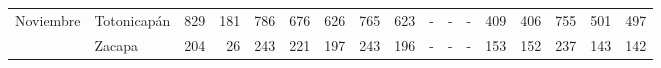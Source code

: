 \begin{landscape}
\begin{center}
\begin{longtable}{llrrrrrrrrrrrrrrr}
\multicolumn{1}{l}{	\footnotesize	 Noviembre 	}&	 Totonicapán 	&	 829 	&	 181 	&	 786 	&	 676 	&	 626 	&	 765 	&	 623 	&	 -   	&	 -   	&	 -   	&	 409 	&	 406 	&	 755 	&	 501 	&	 497 	\\
\rowcolor{color1!5!white}\multicolumn{1}{l}{	\footnotesize	 Noviembre 	}&	 Zacapa 	&	 204 	&	 26 	&	 243 	&	 221 	&	 197 	&	 243 	&	 196 	&	 -   	&	 -   	&	 -   	&	 153 	&	 152 	&	 237 	&	 143 	&	 142 	\\
[-0.28cm]
		\end{longtable}\addtocounter{Cuadro}{1}
	\end{center}
\end{landscape}

